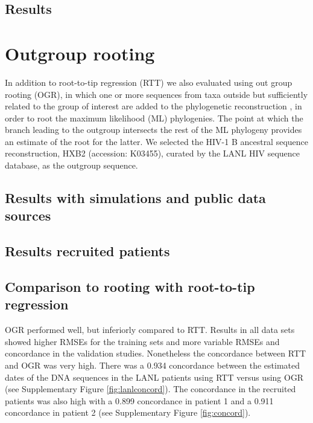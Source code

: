\documentclass[12pt]{article}
\begin{document}
\subsection*{Results}

\section{Outgroup rooting}
In addition to root-to-tip regression (RTT) we also evaluated using out group rooting (OGR), in which one or more sequences from taxa outside but sufficiently related to the group of interest are added to the phylogenetic reconstruction \cite{Huelsenbeck02}, in order to root the maximum likelihood (ML) phylogenies.
The point at which the branch leading to the outgroup intersects the rest of the ML phylogeny provides an estimate of the root for the latter.
We selected the HIV-1 B ancestral sequence reconstruction, HXB2 (accession: K03455), curated by the LANL HIV sequence database, as the outgroup sequence.

\subsection*{Results with simulations and public data sources}

\subsection*{Results recruited patients}

\subsection*{Comparison to rooting with root-to-tip regression}
OGR performed well, but inferiorly compared to RTT.
Results in all data sets showed higher RMSEs for the training sets and more variable RMSEs and concordance in the validation studies.
Nonetheless the concordance between RTT and OGR was very high.
There was a 0.934 concordance \cite{Lin89} between the estimated dates of the DNA sequences in the LANL patients using RTT versus using OGR (see Supplementary Figure \ref{fig:lanlconcord}).
The concordance in the recruited patients was also high with a 0.899 concordance in patient 1 and a 0.911 concordance in patient 2 (see Supplementary Figure \ref{fig:concord}).




\pagebreak
\end{document}
